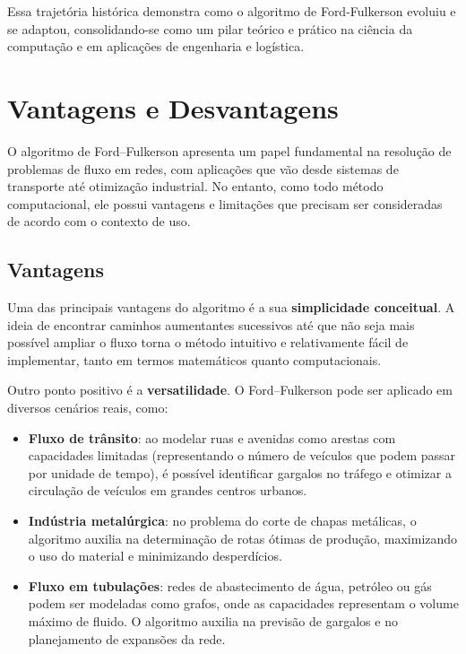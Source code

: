 \documentclass[12pt]{article}
\begin{document}
Essa trajetória histórica demonstra como o algoritmo de Ford-Fulkerson evoluiu e se adaptou, consolidando-se como um pilar teórico e prático na ciência da computação e em aplicações de engenharia e logística.


\section{Vantagens e Desvantagens} \label{sec:vantagens}

O algoritmo de Ford–Fulkerson apresenta um papel fundamental na resolução de problemas de fluxo em redes, com aplicações que vão desde sistemas de transporte até otimização industrial. No entanto, como todo método computacional, ele possui vantagens e limitações que precisam ser consideradas de acordo com o contexto de uso.


\subsection{Vantagens}

Uma das principais vantagens do algoritmo é a sua \textbf{simplicidade conceitual}. A ideia de encontrar caminhos aumentantes sucessivos até que não seja mais possível ampliar o fluxo torna o método intuitivo e relativamente fácil de implementar, tanto em termos matemáticos quanto computacionais.

Outro ponto positivo é a \textbf{versatilidade}. O Ford–Fulkerson pode ser aplicado em diversos cenários reais, como:


\begin{itemize} 
    \item \textbf{Fluxo de trânsito}: ao modelar ruas e avenidas como arestas com capacidades limitadas (representando o número de veículos que podem passar por unidade de tempo), é possível identificar gargalos no tráfego e otimizar a circulação de veículos em grandes centros urbanos.      
    \item \textbf{Indústria metalúrgica}: no problema do corte de chapas metálicas, o algoritmo auxilia na determinação de rotas ótimas de produção, maximizando o uso do material e minimizando desperdícios. 
    \item \textbf{Fluxo em tubulações}: redes de abastecimento de água, petróleo ou gás podem ser modeladas como grafos, onde as capacidades representam o volume máximo de fluido. O algoritmo auxilia na previsão de gargalos e no planejamento de expansões da rede. 
\end{itemize}
\end{document}
